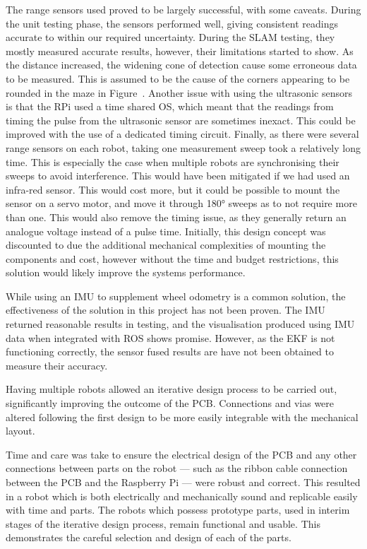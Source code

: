 The range sensors used proved to be largely successful, with some caveats. 
During the unit testing phase, the sensors performed well, giving consistent 
readings accurate to within our required uncertainty. During the SLAM testing, 
they mostly measured accurate results, however, their limitations started to 
show. As the distance increased, the widening cone of detection cause some 
erroneous data to be measured. This is assumed to be the cause of the corners 
appearing to be rounded in the maze in Figure~. 
Another issue with using the ultrasonic sensors is that the RPi used a time 
shared OS, which meant that the readings from timing the pulse from the 
ultrasonic sensor are sometimes inexact. This could be improved with the use of 
a dedicated timing circuit. Finally, as there were several range sensors on each 
robot, taking one measurement sweep took a relatively long time. This is 
especially the case when multiple robots are synchronising their sweeps to avoid 
interference. This would have been mitigated if we had used an infra-red sensor. 
This would cost more, but it could be possible to mount the sensor on a servo 
motor, and move it through \ang{180} sweeps as to not require more than one. 
This would also remove the timing issue, as they generally return an analogue 
voltage instead of a pulse time. Initially, this design concept was discounted 
to due the additional mechanical complexities of mounting the components and 
cost, however without the time and budget restrictions, this solution would 
likely improve the systems performance. 

While using an IMU to supplement wheel odometry is a common solution, the effectiveness of the solution in this project has not been proven. The IMU returned reasonable results in testing, and the visualisation produced using IMU data when integrated with ROS shows promise. However, as the EKF is not functioning correctly, the sensor fused results are have not been obtained to measure their accuracy. 

Having multiple robots allowed an 
iterative design process to be carried out, significantly improving the outcome 
of the PCB. Connections and vias were altered following the first design to be 
more easily integrable with the mechanical layout. 

Time and care was take to ensure the electrical design of the PCB and any other 
connections between parts on the robot --- such as the ribbon cable connection 
between the PCB and the Raspberry Pi --- were robust and correct. This resulted 
in a robot which is both electrically and mechanically sound and replicable 
easily with time and parts. The robots which possess prototype parts, used in 
interim stages of the iterative design process, remain functional and usable. 
This demonstrates the careful selection and design of each of the parts. 

